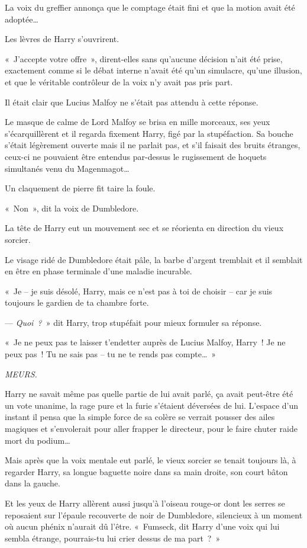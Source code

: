 La voix du greffier annonça que le comptage était fini et que la motion avait été adoptée…

Les lèvres de Harry s'ouvrirent.

«~J'accepte votre offre~», dirent-elles sans qu'aucune décision n'ait été prise, exactement comme si le débat interne n'avait été qu'un simulacre, qu'une illusion, et que le véritable contrôleur de la voix n'y avait pas pris part.

Il était clair que Lucius Malfoy ne s'était pas attendu à cette réponse.

Le masque de calme de Lord Malfoy se brisa en mille morceaux, ses yeux s'écarquillèrent et il regarda fixement Harry, figé par la stupéfaction. Sa bouche s'était légèrement ouverte mais il ne parlait pas, et s'il faisait des bruits étranges, ceux-ci ne pouvaient être entendus par-dessus le rugissement de hoquets simultanés venu du Magenmagot…

Un claquement de pierre fit taire la foule.

«~Non~», dit la voix de Dumbledore.

La tête de Harry eut un mouvement sec et se réorienta en direction du vieux sorcier.

Le visage ridé de Dumbledore était pâle, la barbe d'argent tremblait et il semblait en être en phase terminale d'une maladie incurable.

«~Je -- je suis désolé, Harry, mais ce n'est pas à toi de choisir -- car je suis toujours le gardien de ta chambre forte.

--- \emph{Quoi~?}~» dit Harry, trop stupéfait pour mieux formuler sa réponse.

«~Je ne peux pas te laisser t'endetter auprès de Lucius Malfoy, Harry~! Je ne peux pas~! Tu ne sais pas -- tu ne te rends pas compte…~»

\emph{MEURS.}

Harry ne savait même pas quelle partie de lui avait parlé, ça avait peut-être été un vote unanime, la rage pure et la furie s'étaient déversées de lui. L'espace d'un instant il pensa que la simple force de sa colère se verrait pousser des ailes magiques et s'envolerait pour aller frapper le directeur, pour le faire chuter raide mort du podium…

Mais après que la voix mentale eut parlé, le vieux sorcier se tenait toujours là, à regarder Harry, sa longue baguette noire dans sa main droite, son court bâton dans la gauche.

Et les yeux de Harry allèrent aussi jusqu'à l'oiseau rouge-or dont les serres se reposaient sur l'épaule recouverte de noir de Dumbledore, silencieux à un moment où aucun phénix n'aurait dû l'être. «~Fumseck, dit Harry d'une voix qui lui sembla étrange, pourrais-tu lui crier dessus de ma part~?~»

